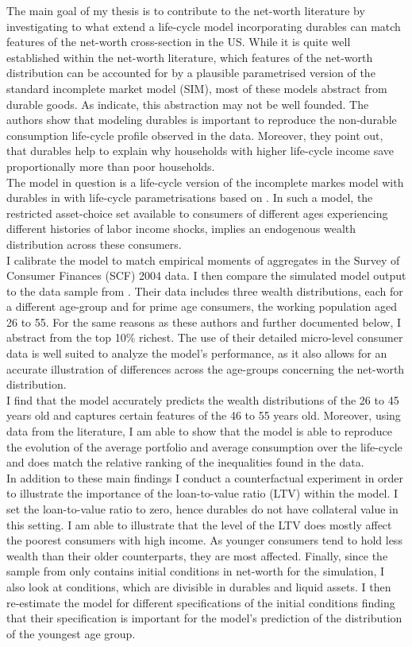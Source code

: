 \documentclass[a4paper,12pt,legno]{article}
\begin{document}
The main goal of my thesis is to contribute to the net-worth literature by investigating to what extend a life-cycle model incorporating durables can match features of the net-worth cross-section in the US. While it is quite well established within the net-worth literature, which features of the net-worth distribution can be accounted for by a plausible parametrised version of the standard incomplete market model (SIM), most of these models abstract from durable goods. As \cite{FV&K2011}  indicate, this abstraction may not be well founded. The authors show that modeling durables is important to reproduce the non-durable consumption life-cycle profile observed in the data. Moreover, they point out, that durables help to explain why households with higher life-cycle income save proportionally more than poor households.\\
The model in question is a life-cycle version of the incomplete markes model with durables in \cite{hintermaier2010} with life-cycle parametrisations based on \cite{hintermaier2011}. In such a model, the restricted asset-choice set available to consumers of different ages experiencing different histories of labor income shocks, implies an endogenous wealth distribution across these consumers. \\
I calibrate the model to match empirical moments of aggregates in the Survey of Consumer Finances (SCF) 2004 data. I then compare the simulated model output to the data sample from \cite{hintermaier2011}. Their data includes three wealth distributions, each for a different age-group and for prime age consumers, the working population aged 26 to 55. For the same reasons as these authors and further documented below, I abstract from the top 10\% richest. The use of their detailed micro-level consumer data is well suited to analyze the model's performance, as it also allows for an accurate illustration of differences across the age-groups concerning the net-worth distribution.\\
I find that the model accurately predicts the wealth distributions of the 26 to 45 years old and captures certain features of the 46 to 55 years old. Moreover, using data from the literature, I am able to show that the model is able to reproduce the evolution of the average portfolio and average consumption over the life-cycle and does match the relative ranking of the inequalities found in the data. 
\\ 
In addition to these main findings I conduct a counterfactual experiment in order to illustrate the importance of the loan-to-value ratio (LTV) within the model. I set the loan-to-value ratio to zero, hence durables do not have collateral value in this setting. I am able to illustrate that the level of the LTV does mostly affect the poorest consumers with high income. As younger consumers tend to hold less wealth than their older counterparts, they are most affected. Finally, since the sample from \cite{hintermaier2011} only contains initial conditions in net-worth for the simulation, I also look at conditions, which are divisible in durables and liquid assets. I then re-estimate the model for different specifications of the initial conditions finding that their specification is important for the model's prediction of the distribution of the youngest age group. 
\end{document}
